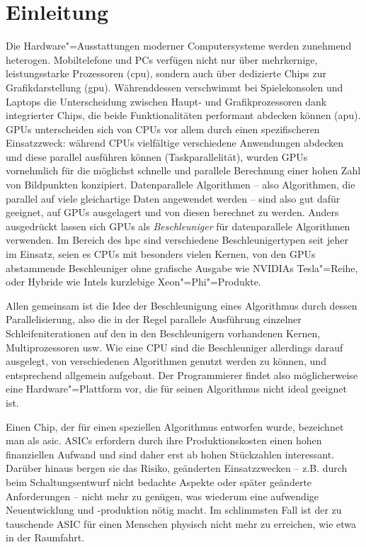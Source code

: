 \chapter{Einleitung}\label{einleitung}

Die Hardware"=Ausstattungen moderner Computersysteme werden zunehmend heterogen.
Mobiltelefone und PCs verfügen nicht nur über mehrkernige, leistungsstarke
Prozessoren (\gls{cpu}), sondern auch über dedizierte Chips zur
Grafikdarstellung (\gls{gpu}). Währenddessen verschwimmt bei Spielekonsolen und
Laptops die Unterscheidung zwischen Haupt- und Grafikprozessoren dank
integrierter Chips, die beide Funktionalitäten performant abdecken können
(\gls{apu}). GPUs unterscheiden sich von CPUs vor allem durch einen
spezifischeren Einsatzzweck: während CPUs vielfältige verschiedene
Anwendungen abdecken und diese parallel ausführen können (Taskparallelität),
wurden GPUs vornehmlich für die möglichst schnelle und parallele Berechnung
einer hohen Zahl von Bildpunkten konzipiert. Datenparallele Algorithmen -- also
Algorithmen, die parallel auf viele gleichartige Daten angewendet werden -- sind
also gut dafür geeignet, auf GPUs ausgelagert und von diesen berechnet zu
werden. Anders ausgedrückt lassen sich GPUs als \textit{Beschleuniger} für
datenparallele Algorithmen verwenden. Im Bereich des \gls{hpc} sind verschiedene
Beschleunigertypen seit jeher im Einsatz, seien es CPUs mit besonders vielen
Kernen, von den GPUs abstammende Beschleuniger ohne grafische Ausgabe wie
NVIDIAs Tesla"=Reihe, oder Hybride wie Intels kurzlebige Xeon"=Phi"=Produkte.

Allen gemeinsam ist die Idee der Beschleunigung eines Algorithmus durch dessen
Parallelisierung, also die in der Regel parallele Ausführung einzelner
Schleifeniterationen auf den in den Beschleunigern vorhandenen Kernen,
Multiprozessoren usw. Wie eine CPU sind die Beschleuniger allerdings darauf
ausgelegt, von verschiedenen Algorithmen genutzt werden zu können, und
entsprechend allgemein aufgebaut. Der Programmierer findet also möglicherweise
eine Hardware"=Plattform vor, die für seinen Algorithmus nicht ideal geeignet
ist.

Einen Chip, der für einen speziellen Algorithmus entworfen wurde, bezeichnet man
als \gls{asic}. ASICs erfordern durch ihre Produktionskosten einen hohen
finanziellen Aufwand und sind daher erst ab hohen Stückzahlen interessant.
Darüber hinaus bergen sie das Risiko, geänderten Einsatzzwecken -- z.B. durch
beim Schaltungsentwurf nicht bedachte Aspekte oder später geänderte
Anforderungen -- nicht mehr zu genügen, was wiederum eine aufwendige
Neuentwicklung und -produktion nötig macht. Im schlimmsten Fall ist der zu
tauschende ASIC für einen Menschen physisch nicht mehr zu erreichen, wie etwa in
der Raumfahrt.

